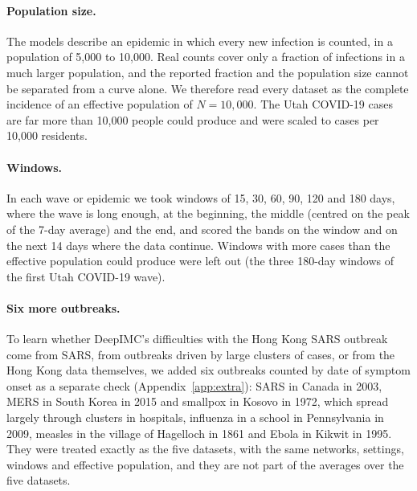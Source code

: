 \documentclass[12pt]{article}
\begin{document}
\paragraph{Population size.} The models describe an epidemic in which every new infection is counted, in
a population of 5,000 to 10,000. Real counts cover only a fraction of infections in a much larger
population, and the reported fraction and the population size cannot be separated from a curve alone.
We therefore read every dataset as the complete incidence of an effective population of $N = 10{,}000$.
The Utah COVID-19 cases are far more than 10,000 people could produce and were scaled to cases per
10,000 residents.

\paragraph{Windows.} In each wave or epidemic we took windows of 15, 30, 60, 90, 120 and 180 days, where the wave
is long enough, at the beginning, the middle (centred on the peak of the 7-day average) and the end, and
scored the bands on the window and on the next 14 days where the data continue. Windows with more cases than
the effective population could produce were left out (the three 180-day windows of the first Utah COVID-19
wave).

\paragraph{Six more outbreaks.} To learn whether DeepIMC's difficulties with the Hong Kong SARS outbreak come from
SARS, from outbreaks driven by large clusters of cases, or from the Hong Kong data themselves, we added six
outbreaks counted by date of symptom onset as a separate check (Appendix~\ref{app:extra}): SARS in Canada in 2003,
MERS in South Korea in 2015 and smallpox in Kosovo in 1972, which spread largely through clusters in hospitals,
influenza in a school in Pennsylvania in 2009, measles in the village of Hagelloch in 1861 and Ebola in Kikwit in
1995. They were treated exactly as the five datasets, with the same networks, settings, windows and effective
population, and they are not part of the averages over the five datasets.
\end{document}
